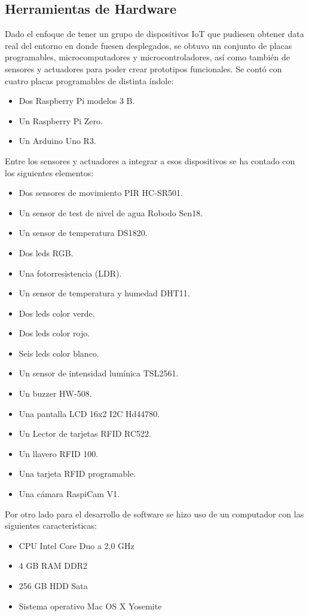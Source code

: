 \subsection{Herramientas de Hardware}
Dado el enfoque de tener un grupo de dispositivos IoT que pudiesen obtener data real del entorno en donde fuesen desplegados, se obtuvo un conjunto de placas programables, microcomputadores y microcontroladores, así como también de sensores y actuadores para poder crear prototipos funcionales. Se contó con cuatro placas programables de distinta índole:
\begin{itemize}
\item Dos Raspberry Pi modelos 3 B.
\item Un Raspberry Pi Zero.
\item Un Arduino Uno R3.
\end{itemize}

Entre los sensores y actuadores a integrar a esos dispositivos se ha contado con los siguientes elementos:
\begin{itemize}
\item Dos sensores de movimiento PIR HC-SR501.
\item Un sensor de test de nivel de agua Robodo Sen18.
\item Un sensor de temperatura DS1820.
\item Dos leds RGB.
\item Una fotorresistencia (LDR).
\item Un sensor de temperatura y humedad DHT11.
\item Dos leds color verde.
\item Dos leds color rojo.
\item Seis leds color blanco.
\item Un sensor de intensidad lumínica TSL2561.
\item Un buzzer HW-508.
\item Una pantalla LCD 16x2 I2C Hd44780.
\item Un Lector de tarjetas RFID RC522.
\item Un llavero RFID 100.
\item Una tarjeta RFID programable. 
\item Una cámara RaspiCam V1.  
\end{itemize}

Por otro lado para el desarrollo de software se hizo uso de un computador con las siguientes características:
\begin{itemize}
\item CPU Intel Core Duo a 2,0 GHz
\item 4 GB RAM DDR2
\item 256 GB HDD Sata
\item Sistema operativo Mac OS X Yosemite
\end{itemize}

